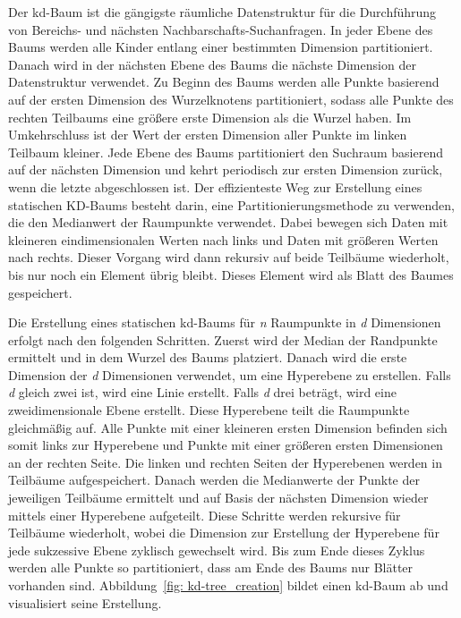 Der kd-Baum ist die gängigste räumliche Datenstruktur für die Durchführung von Bereichs- und nächsten Nachbarschafts-Suchanfragen. In jeder Ebene des Baums werden alle Kinder entlang einer bestimmten Dimension partitioniert. Danach wird in der nächsten Ebene des Baums die nächste Dimension der Datenstruktur verwendet. Zu Beginn des Baums werden alle Punkte basierend auf der ersten Dimension des Wurzelknotens partitioniert, sodass alle Punkte des rechten Teilbaums eine größere erste Dimension als die Wurzel haben. Im Umkehrschluss ist der Wert der ersten Dimension aller Punkte im linken Teilbaum kleiner. Jede Ebene des Baums partitioniert den Suchraum basierend auf der nächsten Dimension und kehrt periodisch zur ersten Dimension zurück, wenn die letzte abgeschlossen ist. Der effizienteste Weg zur Erstellung eines statischen KD-Baums besteht darin, eine Partitionierungsmethode zu verwenden, die den Medianwert der Raumpunkte verwendet. Dabei bewegen sich Daten mit kleineren eindimensionalen Werten nach links und Daten mit größeren Werten nach rechts. Dieser Vorgang wird dann rekursiv auf beide Teilbäume wiederholt, bis nur noch ein Element übrig bleibt. Dieses Element wird als Blatt des Baumes gespeichert. \autocite[92]{saha_advanced_2019}

Die Erstellung eines statischen kd-Baums für \textit{n} Raumpunkte in \textit{d} Dimensionen erfolgt nach den folgenden Schritten. Zuerst wird der Median der Randpunkte ermittelt und in dem Wurzel des Baums platziert. Danach wird die erste Dimension der \textit{d} Dimensionen verwendet, um eine Hyperebene zu erstellen. Falls \textit{d} gleich zwei ist, wird eine Linie erstellt. Falls \textit{d} drei beträgt, wird eine zweidimensionale Ebene erstellt. Diese Hyperebene teilt die Raumpunkte gleichmäßig auf. Alle Punkte mit einer kleineren ersten Dimension befinden sich somit links zur Hyperebene und Punkte mit einer größeren ersten Dimensionen an der rechten Seite. Die linken und rechten Seiten der Hyperebenen werden in Teilbäume aufgespeichert. Danach werden die Medianwerte der Punkte der jeweiligen Teilbäume ermittelt und auf Basis der nächsten Dimension wieder mittels einer Hyperebene aufgeteilt. Diese Schritte werden rekursive für Teilbäume wiederholt, wobei die Dimension zur Erstellung der Hyperebene für jede sukzessive Ebene zyklisch gewechselt wird. Bis zum Ende dieses Zyklus werden alle Punkte so partitioniert, dass am Ende des Baums nur Blätter vorhanden sind. Abbildung~\ref{fig: kd-tree_creation} bildet einen kd-Baum ab und visualisiert seine Erstellung. \autocite[93-94]{saha_advanced_2019} 

